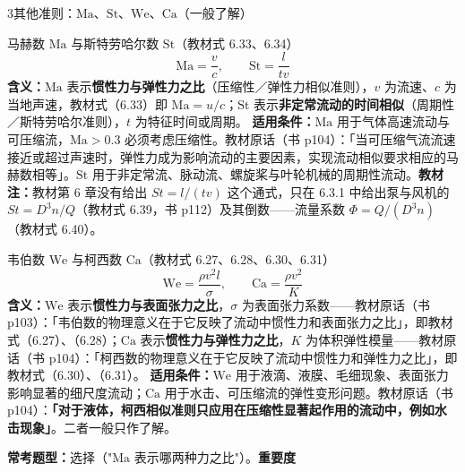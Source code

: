 \begin{kaodian}{3}{其他准则：$\mathrm{Ma}$、$\mathrm{St}$、$\mathrm{We}$、$\mathrm{Ca}$（一般了解）}
\begin{gongshi}{马赫数 $\mathrm{Ma}$ 与斯特劳哈尔数 $\mathrm{St}$（教材式 6.33、6.34）}
\[ \mathrm{Ma}=\frac{v}{c},\qquad \mathrm{St}=\frac{l}{tv} \]
\textbf{含义：}$\mathrm{Ma}$ 表示\textbf{惯性力与弹性力之比}（压缩性／弹性力相似准则），$v$ 为流速、$c$ 为当地声速，教材式（6.33）即 $\mathrm{Ma}=u/c$；$\mathrm{St}$ 表示\textbf{非定常流动的时间相似}（周期性／斯特劳哈尔准则），$t$ 为特征时间或周期。
\textbf{适用条件：}$\mathrm{Ma}$ 用于气体高速流动与可压缩流，$\mathrm{Ma}>0.3$ 必须考虑压缩性。教材原话（书 p104）：「当可压缩气流流速接近或超过声速时，弹性力成为影响流动的主要因素，实现流动相似要求相应的马赫数相等」。$\mathrm{St}$ 用于非定常流、脉动流、螺旋桨与叶轮机械的周期性流动。\textbf{教材注：}教材第 6 章没有给出 $St=l/(tv)$ 这个通式，只在 6.3.1 中给出泵与风机的 $St=D^{3}n/Q$（教材式 6.39，书 p112）及其倒数——流量系数 $\Phi=Q/(D^{3}n)$（教材式 6.40）。
\end{gongshi}

\begin{gongshi}{韦伯数 $\mathrm{We}$ 与柯西数 $\mathrm{Ca}$（教材式 6.27、6.28、6.30、6.31）}
\[ \mathrm{We}=\frac{\rho v^{2}l}{\sigma},\qquad \mathrm{Ca}=\frac{\rho v^{2}}{K} \]
\textbf{含义：}$\mathrm{We}$ 表示\textbf{惯性力与表面张力之比}，$\sigma$ 为表面张力系数——教材原话（书 p103）：「韦伯数的物理意义在于它反映了流动中惯性力和表面张力之比」，即教材式（6.27）、（6.28）；$\mathrm{Ca}$ 表示\textbf{惯性力与弹性力之比}，$K$ 为体积弹性模量——教材原话（书 p104）：「柯西数的物理意义在于它反映了流动中惯性力和弹性力之比」，即教材式（6.30）、（6.31）。
\textbf{适用条件：}$\mathrm{We}$ 用于液滴、液膜、毛细现象、表面张力影响显著的细尺度流动；$\mathrm{Ca}$ 用于水击、可压缩流的弹性变形问题。教材原话（书 p104）：\textbf{「对于液体，柯西相似准则只应用在压缩性显著起作用的流动中，例如水击现象」}。二者一般只作了解。
\end{gongshi}

\textbf{常考题型：}选择（"$\mathrm{Ma}$ 表示哪两种力之比"）。\quad\textbf{重要度 }\quad{}\quad{}
\end{kaodian}

